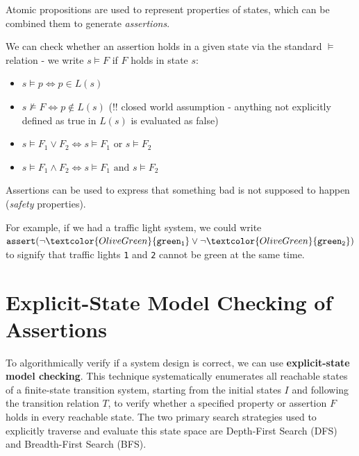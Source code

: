 \documentclass[a4paper, 11pt]{report}
\begin{document}
Atomic propositions are used to represent properties of states, which can be combined them to generate \textit{assertions}.

We can check whether an assertion holds in a given state via the standard $\vDash$ relation - we write $s \vDash F$ if $F$ holds in state $s$:
\begin{itemize}
    \item $s \vDash p \iff p \in L(s)$
    \item $s \not\vDash F \iff p \not\in L(s)$ (!! closed world assumption - anything not explicitly defined as true in $L(s)$ is evaluated as false)
    \item $s \vDash F_{1} \lor F_{2} \iff s \vDash F_{1}\text{ or } s \vDash F_{2}$
    \item $s \vDash F_{1} \land  F_{2} \iff s \vDash F_{1}\text{ and } s \vDash F_{2}$
\end{itemize}

Assertions can be used to express that something bad is not supposed to happen (\textit{safety} properties).

For example, if we had a traffic light system, we could write $\mathtt{assert}(\neg \textcolor{OliveGreen}{\mathtt{green_{1}}} \lor \neg \textcolor{OliveGreen}{\mathtt{green_{2}}})$ to signify that traffic lights \texttt{1} and \texttt{2} cannot be green at the same time.

\section{Explicit-State Model Checking of Assertions}
To algorithmically verify if a system design is correct, we can use \textbf{explicit-state model checking}. This technique systematically enumerates all reachable states of a finite-state transition system, starting from the initial states $I$ and following the transition relation $T$, to verify whether a specified property or assertion $F$ holds in every reachable state. The two primary search strategies used to explicitly traverse and evaluate this state space are Depth-First Search (DFS) and Breadth-First Search (BFS).
\end{document}
